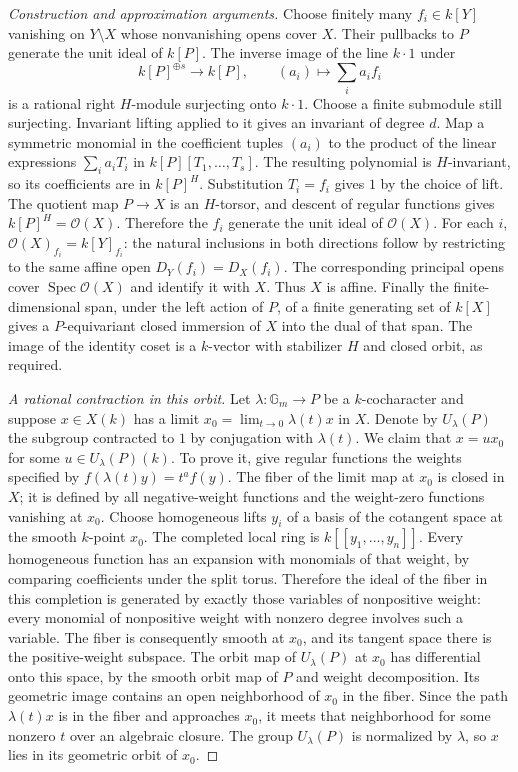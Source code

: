 \documentclass[11pt,a4paper,openany,oneside]{book}
\theoremstyle{resultstyle}
\theoremstyle{definition}
\numberwithin{equation}{chapter}
\begin{document}
\begin{proof}[Construction and approximation arguments]
Choose finitely many \(f_i\in k[Y]\) vanishing on \(Y\setminus X\)
whose nonvanishing opens cover \(X\). Their pullbacks to \(P\)
generate the unit ideal of \(k[P]\). The inverse image of the
line \(k\cdot1\) under
\[
 k[P]^{\oplus s}\longrightarrow k[P],\qquad
 (a_i)\longmapsto\sum_i a_i f_i
\]
is a rational right \(H\)-module surjecting onto \(k\cdot1\).
Choose a finite submodule still surjecting. Invariant lifting
applied to it gives an invariant of degree \(d\). Map a
symmetric monomial in the coefficient tuples \((a_i)\) to the
product of the linear expressions \(\sum_i a_iT_i\) in
\(k[P][T_1,\ldots,T_s]\). The resulting polynomial is
\(H\)-invariant, so its coefficients are in \(k[P]^H\).
Substitution \(T_i=f_i\) gives \(1\) by the choice of lift.
The quotient map \(P\to X\) is an \(H\)-torsor, and descent
of regular functions gives \(k[P]^H=\mathcal O(X)\).
Therefore the \(f_i\) generate the unit ideal of \(\mathcal O(X)\).
For each \(i\), \(\mathcal O(X)_{f_i}=k[Y]_{f_i}\): the natural
inclusions in both directions follow by restricting to the
same affine open \(D_Y(f_i)=D_X(f_i)\). The corresponding
principal opens cover \(\operatorname{Spec}\mathcal O(X)\)
and identify it with \(X\). Thus \(X\) is affine.
Finally the finite-dimensional span, under the left action of
\(P\), of a finite generating set of \(k[X]\) gives a
\(P\)-equivariant closed immersion of \(X\) into the dual
of that span. The image of the identity coset is a \(k\)-vector
with stabilizer \(H\) and closed orbit, as required.

\medskip\noindent
\textit{A rational contraction in this orbit.}
Let \(\lambda:\mathbb G_m\to P\) be a \(k\)-cocharacter and
suppose \(x\in X(k)\) has a limit \(x_0=\lim_{t\to0}\lambda(t)x\)
in \(X\). Denote by \(U_\lambda(P)\) the subgroup contracted
to \(1\) by conjugation with \(\lambda(t)\). We claim that
\(x=u x_0\) for some \(u\in U_\lambda(P)(k)\).
To prove it, give regular functions the weights specified
by \(f(\lambda(t)y)=t^a f(y)\). The fiber of the limit map
at \(x_0\) is closed in \(X\); it is defined by all
negative-weight functions and the weight-zero functions
vanishing at \(x_0\). Choose homogeneous lifts \(y_i\) of a
basis of the cotangent space at the smooth \(k\)-point
\(x_0\). The completed local ring is \(k[[y_1,\ldots,y_n]]\).
Every homogeneous function has an expansion with monomials
of that weight, by comparing coefficients under the split
torus. Therefore the ideal of the fiber in this completion
is generated by exactly those variables of nonpositive
weight: every monomial of nonpositive weight with nonzero
degree involves such a variable. The fiber is consequently
smooth at \(x_0\), and its tangent space there is the
positive-weight subspace. The orbit map of \(U_\lambda(P)\)
at \(x_0\) has differential onto this space, by the smooth
orbit map of \(P\) and weight decomposition. Its geometric
image contains an open neighborhood of \(x_0\) in the
fiber. Since the path \(\lambda(t)x\) is in the fiber and
approaches \(x_0\), it meets that neighborhood for some
nonzero \(t\) over an algebraic closure. The group
\(U_\lambda(P)\) is normalized by \(\lambda\), so \(x\)
lies in its geometric orbit of \(x_0\).


\end{proof}
\end{document}
